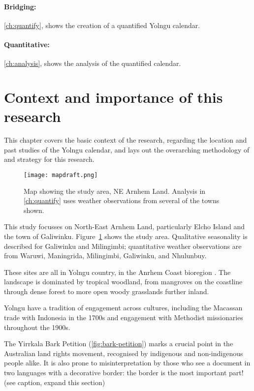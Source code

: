 \paragraph{Bridging:}
\autoref{ch:quantify}, \textit{} shows the creation of a quantified Yolngu calendar.


\paragraph{Quantitative:}
\autoref{ch:analysis}, \textit{} shows the analysis of the quantified calendar.



\section{Context and importance of this research}
\label{ch:context}
This chapter covers the basic context of the research,
regarding the location and past studies of the Yolngu calendar,
and lays out the overarching methodology of and strategy for this research.


\begin{figure}[h]
    \centering
    \texttt{[image: mapdraft.png]}
    \caption[Map showing the study area, NE Arnhem Land]{
        Map showing the study area, NE Arnhem Land.
        Analysis in \autoref{ch:quantify} uses weather observations from several of the towns shown.
        }
    \label{fig:arnhem-map}
\end{figure}


This study focusses on North-East Arnhem Land, particularly Elcho Island
and the town of Galiwinku.  Figure~\ref{fig:arnhem-map} shows the study area.
Qualitative seasonality is described for Galiwinku and Milingimbi;
quantitative weather observations are from Waruwi, Maningrida, Milingimbi,
Galiwinku, and Nhulunbuy.

These sites are all in Yolngu country, in the Anrhem Coast bioregion \citep{ens2014}.
The landscape is dominated by tropical woodland, from mangroves on the coastline 
through dense forest to more open woody grasslands further inland.

Yolngu have a tradition of engagement across cultures, including
the Macassan trade with Indonesia in the 1700s and engagement with Methodist
missionaries throughout the 1900s.

The Yirrkala Bark Petition (\autoref{fig:bark-petition}) marks a crucial
point in the Australian land rights movement, recognised by indigenous and
non-indigenous people alike.  It is also prone to misinterpretation by those
who see a document in two languages with a decorative border: the border
is the most important part!  (see caption, expand this section)


